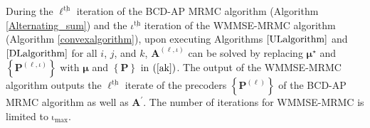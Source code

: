 \documentclass[10pt,journal]{IEEEtran}
\newcommand{\paren}[1]{\left({#1}\right)}
\newcommand{\bracket}[1]{{\left [{#1}\right ]}}
\newcommand{\braces}[1]{{\left\{ {#1}\right\}}}
\newcommand{\ith}[1]    {{#1}^{\underline{\text{th}}}}
\newcommand{\PiB}{\mathbf{P}_{\textrm{u},i}\bracket{k}}
\theoremstyle{definition}
\begin{document}

During the $\ith{\ell}$ iteration of the BCD-AP MRMC algorithm (Algorithm \ref{Alternating_sum}) and the $\ith{\iota}$ iteration of the WMMSE-MRMC algorithm (Algorithm \ref{convexalgorithm}), upon executing Algorithms $\ref{ULalgorithm}$ and $\ref{DLalgorithm}$ for all $i$, $j$, and $k$, $\mathbf{A}^{\paren{\ell,\iota}}$ can be solved by replacing  $\boldsymbol{\mu}^\star$ and $\braces{\mathbf{P}^{\paren{\ell,\iota}}}$ with $\boldsymbol{\mu}$ and $\braces{\mathbf{P}}$ in $\paren{\mathrm{\ref{ak}}}$.  The output of the WMMSE-MRMC algorithm outputs the $\ith{\ell}$ iterate of the precoders $\braces{\mathbf{P}^{\paren{\ell}}}$ of the BCD-AP MRMC algorithm as well as $\mathbf{A}^\prime$.  %
The number of iterations for  WMMSE-MRMC is limited to $\mathrm{\iota}_{\textrm{max}}$.
\end{document}
